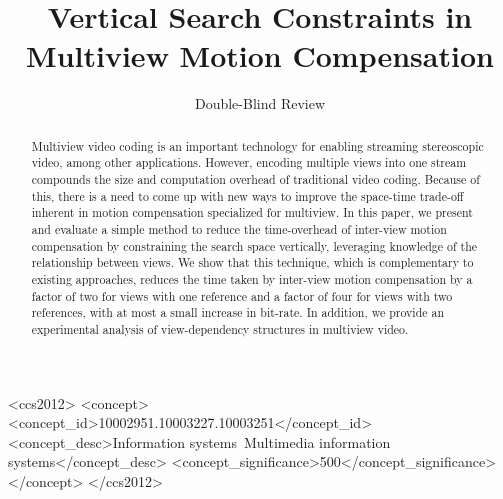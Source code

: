 \documentclass{sig-alternate-05-2015}
\begin{document}


\title{Vertical Search Constraints in Multiview Motion Compensation}
\author{
\alignauthor
Double-Blind Review
}

\maketitle

\begin{abstract}
Multiview video coding is an important technology for enabling streaming
stereoscopic video, among other applications. However, encoding multiple
views into one stream compounds the size and computation overhead of
traditional video coding. Because of this, there is a need to come up with new
ways to improve the space-time trade-off inherent in motion compensation
specialized for multiview. In this paper, we present and evaluate a simple
method to reduce the time-overhead of inter-view motion compensation by
constraining the search space vertically, leveraging knowledge of the
relationship between views. We show that this technique, which is
complementary to existing approaches, reduces the time taken by inter-view
motion compensation by a factor of two for views with one reference and a factor
of four for views with two references, with at most a small increase in
bit-rate. In addition, we provide an experimental analysis of view-dependency
structures in multiview video.
\end{abstract}

\begin{CCSXML}
<ccs2012>
<concept>
<concept_id>10002951.10003227.10003251</concept_id>
<concept_desc>Information systems~Multimedia information systems</concept_desc>
<concept_significance>500</concept_significance>
</concept>
</ccs2012>
\end{CCSXML}
\printccsdesc
\end{document}
